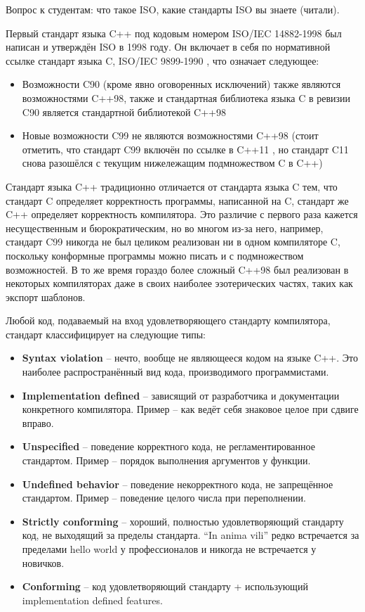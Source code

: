 \documentclass[a4paper,12pt,oneside]{article}
\begin{document}
Вопрос к студентам: что такое ISO, какие стандарты ISO вы знаете (читали).

Первый стандарт языка C++ под кодовым номером ISO/IEC 14882-1998 \cite{stdcpp98} был написан и утверждён ISO в 1998 году. Он включает в себя по нормативной ссылке стандарт языка C, ISO/IEC 9899-1990 \cite{stdc90}, что означает следующее: 
\begin{itemize}
\item
Возможности C90 (кроме явно оговоренных исключений) также являются возможностями C++98, также и стандартная библиотека языка C в ревизии C90 является стандартной библиотекой C++98
\item
Новые возможности C99 \cite{stdc90} не являются возможностями C++98 (стоит отметить, что стандарт C99 включён по ссылке в C++11 \cite{stdcpp11}, но стандарт C11 \cite{stdc11} снова разошёлся с текущим нижележащим подмножеством C в C++)
\end{itemize}

Стандарт языка C++ традиционно отличается от стандарта языка C тем, что стандарт C определяет корректность программы, написанной на C, стандарт же C++ определяет корректность компилятора. Это различие с первого раза кажется несущественным и бюрократическим, но во многом из-за него, например, стандарт C99 никогда не был целиком реализован ни в одном компиляторе C, поскольку конформные программы можно писать и с подмножеством возможностей. В то же время гораздо более сложный C++98 был реализован в некоторых компиляторах даже в своих наиболее эзотерических частях, таких как экспорт шаблонов.

Любой код, подаваемый на вход удовлетворяющего стандарту компилятора, стандарт классифицирует на следующие типы:
\begin{itemize}
\item
 \textbf{Syntax violation} -- нечто, вообще не являющееся кодом на языке C++. Это наиболее распространённый вид кода, производимого программистами.
\item
 \textbf{Implementation defined} – зависящий от разработчика и документации конкретного компилятора. Пример – как ведёт себя знаковое целое при сдвиге вправо.
\item
 \textbf{Unspecified} – поведение корректного кода, не регламентированное стандартом. 
 Пример – порядок выполнения аргументов у функции.
\item
 \textbf{Undefined behavior} – поведение некорректного кода, не запрещённое стандартом. 
 Пример – поведение целого числа при переполнении.
\item
 \textbf{Strictly conforming} – хороший, полностью удовлетворяющий стандарту код, не выходящий за пределы стандарта. ``In anima vili'' редко встречается за пределами hello world у профессионалов и никогда не встречается у новичков.
\item
 \textbf{Conforming} – код удовлетворяющий стандарту + использующий implementation defined features.
\end{itemize}
\end{document}
